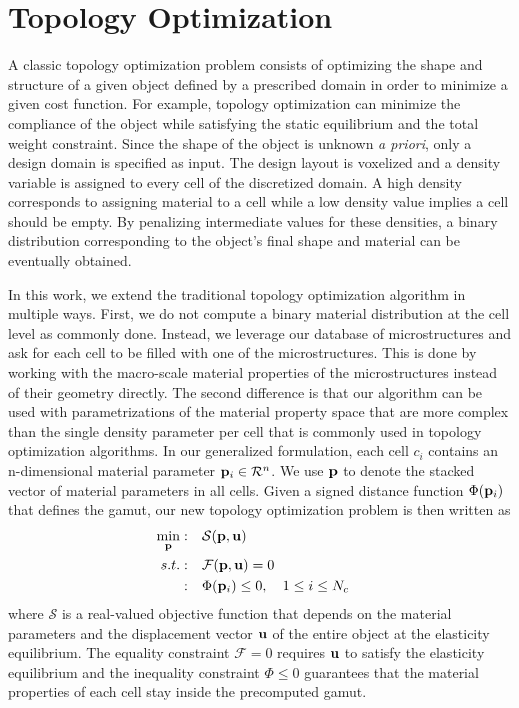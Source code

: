 \section{Topology Optimization}
\label{sec:topoOpt}
A classic topology optimization problem consists of optimizing the shape and structure of a given object defined by a prescribed domain in order to minimize a given cost function.
For example, topology optimization can minimize the compliance of the object while satisfying the static equilibrium and the total weight constraint.
Since the shape of the object is unknown {\it a priori}, only a design domain is specified as input.
The design layout is voxelized and a density variable is assigned to every cell of the discretized domain.
A high density corresponds to assigning material to a cell while a low density value implies a cell should be empty.
By penalizing intermediate values for these densities, a binary distribution corresponding to the object's final shape and material can be eventually obtained.

In this work, we extend the traditional topology optimization algorithm in multiple ways.
First, we do not compute a binary material distribution at the cell level as commonly done.
Instead, we leverage our database of microstructures and ask for each cell to be filled with one of the microstructures.
This is done by working with the macro-scale material properties of the microstructures instead of their geometry directly.
The second difference is that our algorithm can be used with parametrizations of the material property space that are more complex than the single density parameter per cell that is commonly used in topology optimization algorithms.
In our generalized formulation, each cell $c_i$ contains an n-dimensional material parameter $\mathbf{p}_i\in \mathcal{R}^n$.
We use $\mathbf{p}$ to denote the stacked vector of material parameters in all cells.
Given a signed distance function $\Phi(\mathbf{p}_i)$ that defines the gamut,
our new topology optimization problem is then written as
\begin{equation}
\begin{aligned}
\min_{\mathbf{p}} : \quad & \mathcal{S}(\mathbf{p},\mathbf{u}) & \\
s.t. : \quad & \mathcal{F}(\mathbf{\mathbf{p}},\mathbf{u})=0 & \\
: \quad & \Phi(\mathbf{p}_i)\leq 0,  \quad 1\leq i \leq N_c&	
\label{eq:op}
\end{aligned}
\end{equation}
where $\mathcal{S}$ is a real-valued objective function that depends on the material parameters and the displacement vector $\mathbf{u}$ of the entire object at the elasticity equilibrium.
The equality constraint $\mathcal{F}=0$ requires $\mathbf{u}$ to satisfy the elasticity equilibrium and the inequality constraint $\Phi\leq0$ guarantees that the material properties of each cell stay inside the precomputed gamut.

